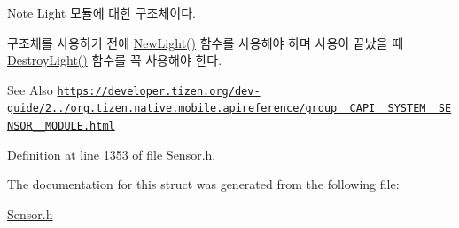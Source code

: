 \begin{DoxyNote}{Note}
Light 모듈에 대한 구조체이다. \par
 구조체를 사용하기 전에 \hyperlink{Sensor_8h_acc102a67ded8d183805b270f2e350dc3}{New\-Light()} 함수를 사용해야 하며 사용이 끝났을 때 \hyperlink{Sensor_8h_a8886d4cca6cda321936c1db6050f46c9}{Destroy\-Light()} 함수를 꼭 사용해야 한다. 
\end{DoxyNote}
\begin{DoxySeeAlso}{See Also}
\href{https://developer.tizen.org/dev-guide/2.3.0/org.tizen.native.mobile.apireference/group__CAPI__SYSTEM__SENSOR__MODULE.html}{\tt https\-://developer.\-tizen.\-org/dev-\/guide/2../org.\-tizen.\-native.\-mobile.\-apireference/group\-\_\-\-\_\-\-C\-A\-P\-I\-\_\-\-\_\-\-S\-Y\-S\-T\-E\-M\-\_\-\-\_\-\-S\-E\-N\-S\-O\-R\-\_\-\-\_\-\-M\-O\-D\-U\-L\-E.\-html} 
\end{DoxySeeAlso}


Definition at line 1353 of file Sensor.\-h.



The documentation for this struct was generated from the following file\-:\begin{DoxyCompactItemize}
\item 
\hyperlink{Sensor_8h}{Sensor.\-h}\end{DoxyCompactItemize}
